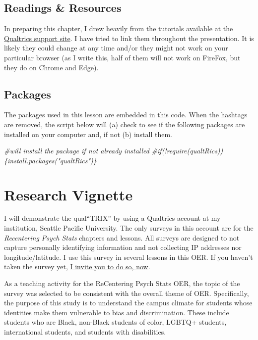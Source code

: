 \documentclass[
  english,
]{book}
\newenvironment{Shaded}{\begin{snugshade}}{\end{snugshade}}
\newcommand{\CommentTok}[1]{\textcolor[rgb]{0.56,0.35,0.01}{\textit{#1}}}
\begin{document}
\hypertarget{readings-resources-1}{%
\subsection{Readings \& Resources}\label{readings-resources-1}}

In preparing this chapter, I drew heavily from the tutorials available at the \href{https://www.qualtrics.com/support/}{Qualtrics support site}. I have tried to link them throughout the presentation. It is likely they could change at any time and/or they might not work on your particular browser (as I write this, half of them will not work on FireFox, but they do on Chrome and Edge).

\hypertarget{packages-1}{%
\subsection{Packages}\label{packages-1}}

The packages used in this lesson are embedded in this code. When the hashtags are removed, the script below will (a) check to see if the following packages are installed on your computer and, if not (b) install them.

\begin{Shaded}
\begin{Highlighting}[]
\CommentTok{#will install the package if not already installed}
\CommentTok{#if(!require(qualtRics))\{install.packages("qualtRics")\}}
\end{Highlighting}
\end{Shaded}

\hypertarget{research-vignette}{%
\section{Research Vignette}\label{research-vignette}}

I will demonstrate the qual``TRIX'' by using a Qualtrics account at my institution, Seattle Pacific University. The only surveys in this account are for the \emph{Recentering Psych Stats} chapters and lessons. All surveys are designed to not capture personally identifying information and not collecting IP addresses nor longitude/latitude. I use this survey in several lessons in this OER. If you haven't taken the survey yet, \href{https://spupsych.az1.qualtrics.com/jfe/form/SV_b2cClqAlLGQ6nLU}{I invite you to do so, now}.

As a teaching activity for the ReCentering Psych Stats OER, the topic of the survey was selected to be consistent with the overall theme of OER. Specifically, the purpose of this study is to understand the campus climate for students whose identities make them vulnerable to bias and discrimination. These include students who are Black, non-Black students of color, LGBTQ+ students, international students, and students with disabilities.
\end{document}
